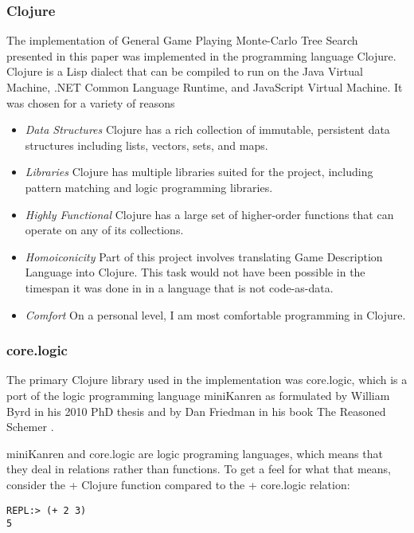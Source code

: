 \documentclass[letterpaper]{article}
\begin{document}
\subsubsection{Clojure}
The implementation of General Game Playing Monte-Carlo Tree Search presented in this paper was implemented in the programming language Clojure. Clojure is a Lisp dialect that can be compiled to run on the Java Virtual Machine, .NET Common Language Runtime, and JavaScript Virtual Machine. It was chosen for a variety of reasons
\begin{itemize}
\item \emph{Data Structures} Clojure has a rich collection of immutable, persistent data structures including lists, vectors, sets, and maps.
\item \emph{Libraries} Clojure has multiple libraries suited for the project, including pattern matching and logic programming libraries.
\item \emph{Highly Functional} Clojure has a large set of higher-order functions that can operate on any of its collections.
\item \emph{Homoiconicity} Part of this project involves translating Game Description Language into Clojure. This task would not have been possible in the timespan it was done in in a language that is not code-as-data.
\item \emph{Comfort} On a personal level, I am most comfortable programming in Clojure.
\end{itemize}
\subsubsection{core.logic}
The primary Clojure library used in the implementation was core.logic, which is a port of the logic programming language miniKanren as formulated by William Byrd in his 2010 PhD thesis \cite{byrd2010relational} and by Dan Friedman in his book The Reasoned Schemer \cite{reasonedschemer}.

miniKanren and core.logic are logic programing languages, which means that they deal in relations rather than functions. To get a feel for what that means, consider the + Clojure function compared to the + core.logic relation:

\begin{lstlisting}[frame=single, caption=The + function]
REPL:> (+ 2 3)
5
\end{lstlisting}
\end{document}
